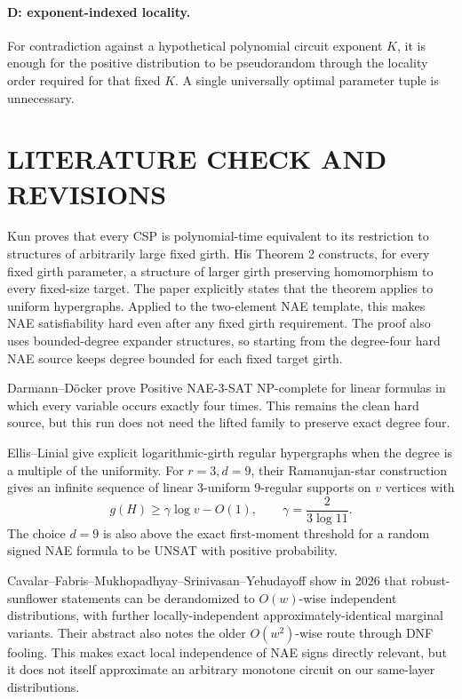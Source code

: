 \documentclass[11pt]{article}
\begin{document}
\paragraph{D: exponent-indexed locality.} For contradiction against a hypothetical polynomial circuit exponent $K$, it is enough for the positive distribution to be pseudorandom through the locality order required for that fixed $K$. A single universally optimal parameter tuple is unnecessary.

\section{LITERATURE CHECK AND REVISIONS}
Kun proves that every CSP is polynomial-time equivalent to its restriction to structures of arbitrarily large fixed girth. His Theorem 2 constructs, for every fixed girth parameter, a structure of larger girth preserving homomorphism to every fixed-size target. The paper explicitly states that the theorem applies to uniform hypergraphs. Applied to the two-element NAE template, this makes NAE satisfiability hard even after any fixed girth requirement. The proof also uses bounded-degree expander structures, so starting from the degree-four hard NAE source keeps degree bounded for each fixed target girth.

Darmann--D\"ocker prove Positive NAE-3-SAT NP-complete for linear formulas in which every variable occurs exactly four times. This remains the clean hard source, but this run does not need the lifted family to preserve exact degree four.

Ellis--Linial give explicit logarithmic-girth regular hypergraphs when the degree is a multiple of the uniformity. For $r=3,d=9$, their Ramanujan-star construction gives an infinite sequence of linear 3-uniform 9-regular supports on $v$ vertices with
\[g(H)\ge \gamma\log v-O(1),\qquad \gamma=\frac{2}{3\log 11}.\]
The choice $d=9$ is also above the exact first-moment threshold for a random signed NAE formula to be UNSAT with positive probability.

Cavalar--Fabris--Mukhopadhyay--Srinivasan--Yehudayoff show in 2026 that robust-sunflower statements can be derandomized to $O(w)$-wise independent distributions, with further locally-independent approximately-identical marginal variants. Their abstract also notes the older $O(w^2)$-wise route through DNF fooling. This makes exact local independence of NAE signs directly relevant, but it does not itself approximate an arbitrary monotone circuit on our same-layer distributions.
\end{document}
